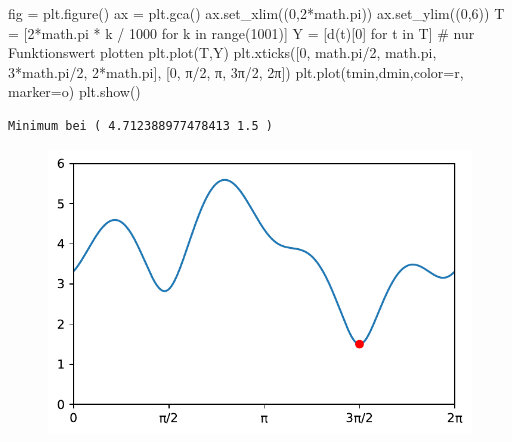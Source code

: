 \documentclass[
  a4paper,
  DIV=11]{scrreprt}
\newenvironment{Shaded}{\begin{snugshade}}{\end{snugshade}}
\newcommand{\BuiltInTok}[1]{\textcolor[rgb]{0.00,0.23,0.31}{#1}}
\newcommand{\CommentTok}[1]{\textcolor[rgb]{0.37,0.37,0.37}{#1}}
\newcommand{\ControlFlowTok}[1]{\textcolor[rgb]{0.00,0.23,0.31}{#1}}
\newcommand{\DecValTok}[1]{\textcolor[rgb]{0.68,0.00,0.00}{#1}}
\newcommand{\KeywordTok}[1]{\textcolor[rgb]{0.00,0.23,0.31}{#1}}
\newcommand{\NormalTok}[1]{\textcolor[rgb]{0.00,0.23,0.31}{#1}}
\newcommand{\OperatorTok}[1]{\textcolor[rgb]{0.37,0.37,0.37}{#1}}
\newcommand{\StringTok}[1]{\textcolor[rgb]{0.13,0.47,0.30}{#1}}
\theoremstyle{definition}
\theoremstyle{definition}
\theoremstyle{remark}
\begin{document}
\begin{tcolorbox}
\begin{Shaded}
\begin{Highlighting}[]
\NormalTok{    fig }\OperatorTok{=}\NormalTok{ plt.figure()}
\NormalTok{    ax }\OperatorTok{=}\NormalTok{ plt.gca()}
\NormalTok{    ax.set\_xlim((}\DecValTok{0}\NormalTok{,}\DecValTok{2}\OperatorTok{*}\NormalTok{math.pi))}
\NormalTok{    ax.set\_ylim((}\DecValTok{0}\NormalTok{,}\DecValTok{6}\NormalTok{))}
\NormalTok{    T }\OperatorTok{=}\NormalTok{ [}\DecValTok{2}\OperatorTok{*}\NormalTok{math.pi }\OperatorTok{*}\NormalTok{ k }\OperatorTok{/} \DecValTok{1000} \ControlFlowTok{for}\NormalTok{ k }\KeywordTok{in} \BuiltInTok{range}\NormalTok{(}\DecValTok{1001}\NormalTok{)]}
\NormalTok{    Y }\OperatorTok{=}\NormalTok{ [d(t)[}\DecValTok{0}\NormalTok{] }\ControlFlowTok{for}\NormalTok{ t }\KeywordTok{in}\NormalTok{ T]  }\CommentTok{\# nur Funktionswert plotten}
\NormalTok{    plt.plot(T,Y)}
\NormalTok{    plt.xticks([}\DecValTok{0}\NormalTok{, math.pi}\OperatorTok{/}\DecValTok{2}\NormalTok{, math.pi, }\DecValTok{3}\OperatorTok{*}\NormalTok{math.pi}\OperatorTok{/}\DecValTok{2}\NormalTok{, }\DecValTok{2}\OperatorTok{*}\NormalTok{math.pi],}
\NormalTok{               [}\StringTok{\textquotesingle{}0\textquotesingle{}}\NormalTok{, }\StringTok{\textquotesingle{}π/2\textquotesingle{}}\NormalTok{, }\StringTok{\textquotesingle{}π\textquotesingle{}}\NormalTok{, }\StringTok{\textquotesingle{}3π/2\textquotesingle{}}\NormalTok{, }\StringTok{\textquotesingle{}2π\textquotesingle{}}\NormalTok{])}
\NormalTok{    plt.plot(tmin,dmin,color}\OperatorTok{=}\StringTok{\textquotesingle{}r\textquotesingle{}}\NormalTok{, marker}\OperatorTok{=}\StringTok{\textquotesingle{}o\textquotesingle{}}\NormalTok{)}
\NormalTok{    plt.show()      }
\end{Highlighting}
\end{Shaded}

\begin{verbatim}
Minimum bei ( 4.712388977478413 1.5 )
\end{verbatim}

\begin{figure}[H]

{\centering \includegraphics{ADOneDimManually_files/figure-pdf/fig-mindistproblemsolution-output-2.pdf}

}
\end{figure}
\end{tcolorbox}
\end{document}

